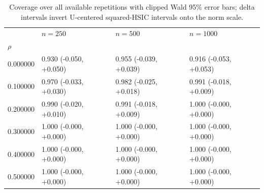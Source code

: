 \begin{table}
\caption{Coverage over all available repetitions with clipped Wald 95\% error bars; delta intervals invert U-centered squared-HSIC intervals onto the norm scale.}
\label{tab:experiment_details_reverse_triangle_coverage_main}
\begin{tabular}{llll}
\toprule
 & $n=250$ & $n=500$ & $n=1000$ \\
$\rho$ &  &  &  \\
\midrule
0.000000 & 0.930 (-0.050, +0.050) & 0.955 (-0.039, +0.039) & 0.916 (-0.053, +0.053) \\
0.100000 & 0.970 (-0.033, +0.030) & 0.982 (-0.025, +0.018) & 0.991 (-0.018, +0.009) \\
0.200000 & 0.990 (-0.020, +0.010) & 0.991 (-0.018, +0.009) & 1.000 (-0.000, +0.000) \\
0.300000 & 1.000 (-0.000, +0.000) & 1.000 (-0.000, +0.000) & 1.000 (-0.000, +0.000) \\
0.400000 & 1.000 (-0.000, +0.000) & 1.000 (-0.000, +0.000) & 1.000 (-0.000, +0.000) \\
0.500000 & 1.000 (-0.000, +0.000) & 1.000 (-0.000, +0.000) & 1.000 (-0.000, +0.000) \\
\bottomrule
\end{tabular}
\end{table}
